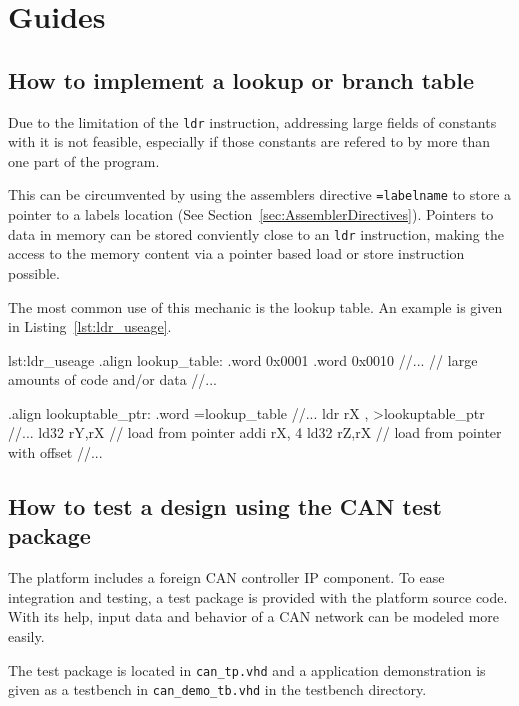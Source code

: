 \chapter{Guides}

\section{How to implement a lookup or branch table}
Due to the limitation of the \verb=ldr= instruction,
addressing large fields of constants with it is not feasible,
especially if those constants are refered to by more than one part of the program.

This can be circumvented by using the assemblers directive \verb|=labelname| to store a pointer to a labels location (See Section~\ref{sec:AssemblerDirectives}).
Pointers to data in memory can be stored conviently close to an \verb=ldr= instruction, 
making the access to the memory content via a pointer based load or store instruction possible.

The most common use of this mechanic is the lookup table.
An example is given in Listing~\ref{lst:ldr_useage}.

\begin{asm}{lst:ldr_useage}
.align
lookup_table:
    .word 0x0001
    .word 0x0010
//...
// large amounts of code and/or data
//...

.align
lookuptable_ptr: 
    .word =lookup_table
//...
    ldr rX , >lookuptable_ptr
//...
    ld32 rY,rX // load from pointer
    addi rX, 4
    ld32 rZ,rX // load from pointer with offset
//...
\end{asm}

\clearpage
\section{How to test a design using the CAN test package}
The platform includes a foreign CAN controller IP component. 
To ease integration and testing, a test package is provided with the platform source code.
With its help, input data and behavior of a CAN network can be modeled more easily.

The test package is located in \verb=can_tp.vhd= and a application demonstration is given as a testbench in \verb=can_demo_tb.vhd= in the testbench directory.

